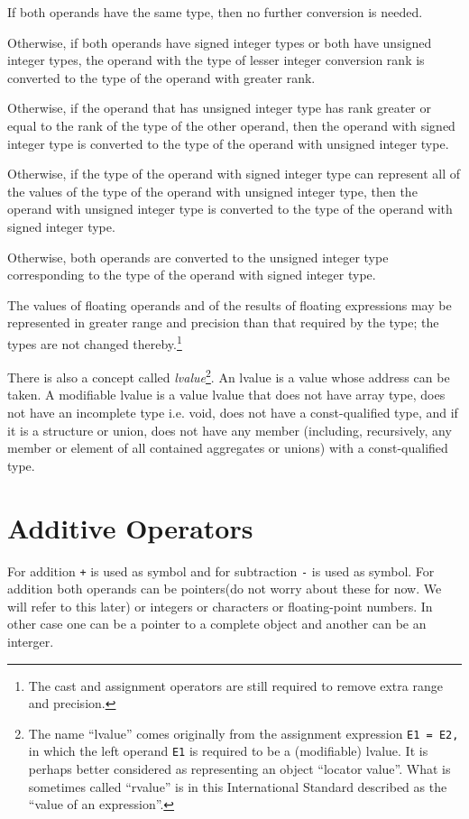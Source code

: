 \noindent If both operands have the same type, then no further conversion is needed.


\noindent Otherwise, if both operands have signed integer types or both have unsigned
integer types, the operand with the type of lesser integer conversion rank is
converted to the type of the operand with greater rank.


\noindent Otherwise, if the operand that has unsigned integer type has rank greater or
equal to the rank of the type of the other operand, then the operand with
signed integer type is converted to the type of the operand with unsigned
integer type.


\noindent Otherwise, if the type of the operand with signed integer type can represent
all of the values of the type of the operand with unsigned integer type, then
the operand with unsigned integer type is converted to the type of the
operand with signed integer type.


\noindent Otherwise, both operands are converted to the unsigned integer type
corresponding to the type of the operand with signed integer type.


\setlength{\leftskip}{0cm}
The values of floating operands and of the results of floating expressions may
be represented in greater range and precision than that required by the type;
the types are not changed thereby.\footnote{The cast and assignment operators
  are still required to remove extra range and precision.}

There is also a concept called \textit{lvalue}\footnote{The name ``lvalue''
  comes originally from the assignment expression \texttt{E1 = E2,} in which
  the left operand \texttt{E1} is required to be a (modifiable) lvalue. It is
  perhaps better considered as representing an object ``locator value''. What
  is sometimes called ``rvalue'' is in this International Standard described 
  as the ``value of an expression''.}. An lvalue is a value whose
address can be taken. A modifiable lvalue is a value lvalue that does not have
array type, does not have an incomplete type i.e. void, does not have a
const-qualified type, and if it is a structure or union, does not have any
member (including, recursively, any member or element of all contained
aggregates or unions) with a const-qualified type.

\section{Additive Operators}
For addition \texttt{+} is used as symbol and for subtraction \texttt{-} is
used as symbol. For addition both operands can be pointers(do not worry about
these for now. We will refer to this later) or integers or characters or 
floating-point numbers. In other
case one can be a pointer to a complete object and another can be an interger.

